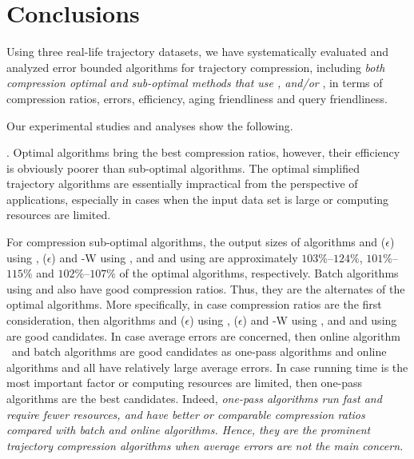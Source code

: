 \section{Conclusions}

Using three real-life trajectory datasets, we have systematically evaluated and analyzed error bounded \lsa algorithms for trajectory compression, including \emph{both compression optimal and sub-optimal methods that use \ped, \sed and/or \dad},  in terms of compression ratios, errors, efficiency, aging friendliness and query friendliness.


Our experimental studies and analyses show the following.


. Optimal algorithms bring the best compression ratios, however, their efficiency is obviously poorer than sub-optimal algorithms. The optimal simplified trajectory algorithms are essentially impractical from the perspective of applications, especially in cases when the input data set is large or computing resources are limited.

For compression sub-optimal algorithms, the output sizes of algorithms \bqsa and \siped($\epsilon$) using \ped, \cised($\epsilon$) {and \cised-W} using \sed, and \tpa and \interval using \dad are approximately $103\%$--$124\%$, $101\%$--$115\%$ and $102\%$--$107\%$ of the optimal algorithms, respectively. Batch algorithms using \ped and \sed also have good compression ratios. Thus, they are the alternates of the optimal algorithms.
%
More specifically, in case compression ratios are the first consideration, then algorithms \bqsa and \siped($\epsilon$) using \ped, \cised($\epsilon$) {and \cised-W} using \sed, and \tpa and \interval using \dad are good candidates.
%
In case average errors are concerned, then {online algorithm \dagots}~and batch algorithms are good candidates as one-pass algorithms and online algorithms \opwa and \bqsa all have relatively large average errors. %
%
In case running time is the most important factor or computing resources are limited, then one-pass algorithms are the best candidates.
%
Indeed, \emph{one-pass algorithms run fast and require fewer resources, and have better or comparable compression ratios compared with batch and online algorithms. Hence, they are the prominent trajectory compression algorithms when average errors are not the main concern.}

